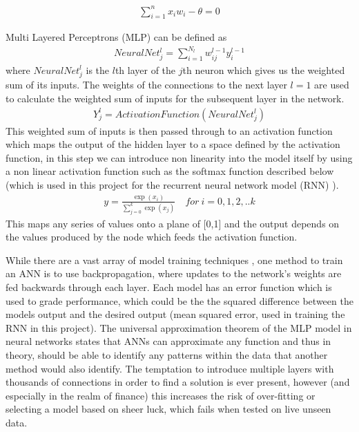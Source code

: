 \documentclass[11pt]{article}
\begin{document}
\begin{align}
\sum^{n}_{i = 1} x_{i}w_{i} - \theta = 0  
\end{align}

Multi Layered Perceptrons (MLP) can be defined as 
\begin{align}
NeuralNet^{l}_{j} =  \sum^{N_{l}}_{i = 1}w^{l-1}_{ij} y^{l-1}_{i}  
\end{align}
where $NeuralNet^{l}_{j}$ is the $l$th layer of the $j$th neuron which gives us the weighted sum of its inputs. The weights of the connections to the next layer $l=1$ are used to calculate the weighted sum of inputs for the subsequent layer in the network.  \begin{align}
Y^{l}_{j} =  ActivationFunction(NeuralNet^{l}_{j})  
\end{align} 
This weighted sum of inputs is then passed through to an activation function which maps the output of the hidden layer to a space defined by the activation function, in this step we can introduce non linearity into the model itself by using a non linear activation function such as the softmax function described below (which is used in this project for the recurrent neural network model (RNN) ).
\begin{align}
y =  \frac{\exp(x_{i})}{\sum^{k}_{j=0}\exp(x_{j}) } \quad for \  i = 0,1,2,..k
\end{align} 
This maps any series of values onto a plane of [0,1] and the output depends on the values produced by the node which feeds the activation function. \par While there are a vast array of model training techniques , one method to train an ANN is to use backpropagation, where updates to the network's weights are fed backwards through each layer. Each model has an error function which is used to grade performance, which could be the the squared difference between the models output and the desired output (mean squared error, used in training the RNN in this project).  \newline The universal approximation theorem \cite{Kurkova1992} of the MLP model in neural networks states that ANNs can approximate any function and thus in theory, should be able to identify any patterns within the data that another method would also identify. \newline The temptation to introduce multiple layers with thousands of connections in order to find a solution is ever present, however (and especially in the realm of finance) this increases the risk of over-fitting or selecting a model based on sheer luck, which fails when tested on live unseen data.
\end{document}
